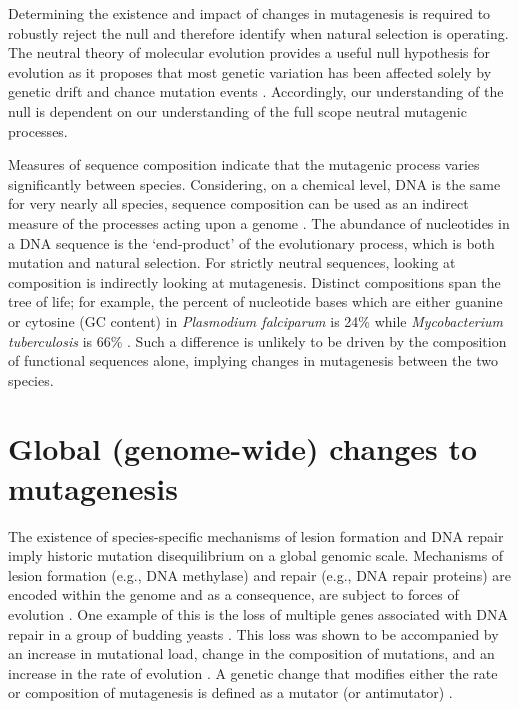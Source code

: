 Determining the existence and impact of changes in mutagenesis is required to robustly reject the null and therefore identify when natural selection is operating. The neutral theory of molecular evolution provides a useful null hypothesis for evolution as it proposes that most genetic variation has been affected solely by genetic drift and chance mutation events \citep{Kimura1968EvolutionaryLevel, King1969Non-DarwinianEvolution}. Accordingly, our understanding of the null is dependent on our understanding of the full scope neutral mutagenic processes. 

Measures of sequence composition indicate that the mutagenic process varies significantly between species. Considering, on a chemical level, DNA is the same for very nearly all species, sequence composition can be used as an indirect measure of the processes acting upon a genome \citep{Karlin1994ComparisonsSequences, Karlin1995DinucleotideSignature}. The abundance of nucleotides in a DNA sequence is the `end-product' of the evolutionary process, which is both mutation and natural selection. For strictly neutral sequences, looking at composition is indirectly looking at mutagenesis. Distinct compositions span the tree of life; for example, the percent of nucleotide bases which are either guanine or cytosine (GC content) in \textit{Plasmodium falciparum} is 24\% while \textit{Mycobacterium tuberculosis} is  66\% \citep{Nakamura2000Codon2000}. Such a difference is unlikely to be driven by the composition of functional sequences alone, implying changes in mutagenesis between the two species. 

\section{Global (genome-wide) changes to mutagenesis}

The existence of species-specific mechanisms of lesion formation \citep{Moore2012DNAFunction} and DNA repair \citep{Kelner1949EffectInjury} imply historic mutation disequilibrium on a global genomic scale. Mechanisms of lesion formation (e.g., DNA methylase) and repair (e.g., DNA repair proteins) are encoded within the genome and as a consequence, are subject to forces of evolution \citep{Lynch2010EvolutionRate, Lynch2016GeneticRate}. One example of this is the loss of multiple genes associated with DNA repair in a group of budding yeasts \citep{Steenwyk2019ExtensiveYeasts}. This loss was shown to be accompanied by an increase in mutational load, change in the composition of mutations, and an increase in the rate of evolution \citep{Steenwyk2019ExtensiveYeasts}. A genetic change that modifies either the rate or composition of mutagenesis is defined as a mutator (or antimutator) \citep{Lynch2016GeneticRate}. 

